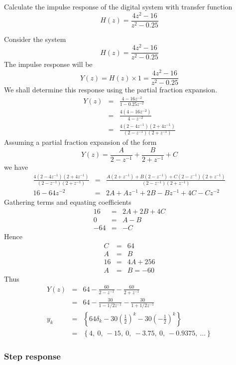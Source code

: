\ifslidesonly
\begin{slide}\label{slide:l9s7} 
Calculate the impulse response of the digital system with transfer function
  \[ H(z) = \frac{4z^2 - 16}{z^2 - 0.25}\]
\end{slide}
\fi
Consider the system
\[ H(z) = \frac{4z^2 - 16}{z^2 - 0.25}\]
The impulse response will be
\[ Y(z) = H(z)\times 1 = \frac{4z^2 - 16}{z^2 - 0.25}\]
We shall determine this response using the partial fraction
expansion.
\begin{eqnarray*}
Y(z) &=& \frac{4 - 16z^{-2}}{1 - 0.25 z^{-2}}\\
     &=& \frac{4(4 - 16z^{-2})}{4 - z^{-2}}\\
     &=& \frac{4(2 - 4z^{-1})(2 + 4z^{-1})}{(2 - z^{-1})(2 + z^{-1})}
\end{eqnarray*}
Assuming a partial fraction expansion of the form \[Y(z) =
\frac{A}{2 - z^{-1}} + \frac{B}{2 + z^{-1}} + C \]  we have
\begin{eqnarray*}
 \frac{4(2 - 4z^{-1})(2 + 4z^{-1})}{(2 - z^{-1})(2 + z^{-1})}
     &=& \frac{A(2 + z^{-1}) + B(2 - z^{-1}) + C(2 - z^{-1})(2 + z^{-1})}{(2 - z^{-1})(2 + z^{-1})}\\
     16 - 64z^{-2} &=& 2A + Az^{-1} + 2B - Bz^{-1} + 4C - Cz^{-2}
 \end{eqnarray*}
Gathering terms and equating coefficients
\begin{eqnarray}
16 &=& 2A +2B + 4C\\ 0 &=& A - B\\ -64 &=& -C
\end{eqnarray}
Hence
\begin{eqnarray}
C &=& 64\\ A &=& B\\ 16 &=& 4A + 256\\ A &=& B = -60
\end{eqnarray}
Thus
\begin{eqnarray*}
    Y(z) &=& 64 -\frac{60}{2-z^{-1}}-\frac{60}{2+z^{-1}}\\
    &=& 64 -\frac{30}{1-1/2 z^{-1}}-\frac{30}{1+1/2 z^{-1}}\\
     y_k& =& \left\{64\delta_k - 30\left(\frac{1}{2}\right)^k - 30
\left(-\frac{1}{2}\right)^k\right\}\\
 &=& \left\{4,\ 0,\ -15,\ 0,\ -3.75,\ 0,\ -0.9375,\ \ldots
 \right\}
\end{eqnarray*}

\subsubsection*{Step response}


